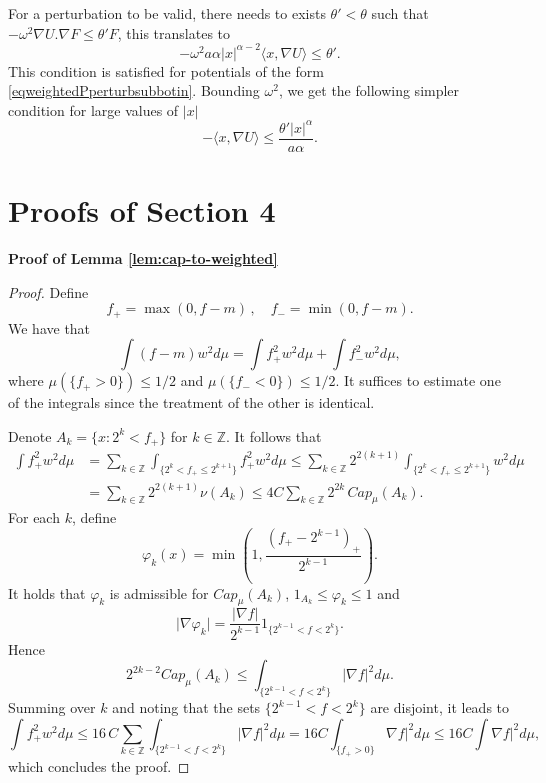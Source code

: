 \documentclass[11pt,reqno]{amsart}
\numberwithin{equation}{section}
\theoremstyle{definition}
\theoremstyle{remark}
\begin{document}
\begin{enumerate}
For a perturbation to be valid, there needs to exists $\theta'<\theta$ such that $-\omega^2\nabla U.\nabla F\le \theta' F$, this translates to 
    $$-\omega^2a\alpha\vert x\vert^{\alpha-2}\langle x, \nabla U\rangle\leq \theta'.$$
    This condition is satisfied for potentials of the form \eqref{eqweightedPperturbsubbotin}. Bounding $\omega^2$, we get the following simpler condition  for large values of $\vert x\vert$
    \begin{equation*}
        -\langle x, \nabla U\rangle\leq \frac{\theta'\vert x\vert^\alpha}{a\alpha}.
    \end{equation*}
\end{enumerate}

\section{Proofs of Section 4}\label{appendix_section_4}

\noindent \textbf{Proof of Lemma \ref{lem:cap-to-weighted}}
\begin{proof}
Define 
$$
f_+ = \max(0, f-m)\,,\quad f_- = \min(0, f-m).
$$
We have that 
$$
\int (f-m)w^2d\mu = \int f_+^2 w^2d\mu + \int f_-^2 w^2d\mu,
$$
where $\mu(\{f_+>0\}) \leq 1/2$ and $\mu(\{f_-<0\}) \leq 1/2$. It suffices to estimate one of the integrals since the treatment of the other is identical. 

Denote $A_k = \{x:2^k<f_+\}$ for $k\in\mathbb{Z}$. It follows that
\begin{align*}
\int f_+^2w^2 d\mu &= \sum_{k\in\mathbb{Z}} \int_{\{2^k<f_+\le 2^{k+1}\}} f_+^2w^2d\mu \leq  \sum_{k\in\mathbb{Z}} 2^{2(k+1)}\int_{\{2^k<f_+\le 2^{k+1}\}} w^2d\mu \\
&= \sum_{k\in\mathbb{Z}} 2^{2(k+1)}\nu(A_k)\le 4C \sum_{k\in\mathbb{Z}} 2^{2k} \,Cap_\mu(A_k).
\end{align*}
For each $k$, define
$$
\varphi_k(x) = \min\left(1, \frac{(f_+-2^{k-1})_+}{2^{k-1}}\right).
$$
It holds that $\varphi_k$ is admissible for $Cap_\mu(A_k)$,
$1_{A_k} \le \varphi_k\leq 1
$
and 
$$
\vert \nabla \varphi_k\vert = \frac{\vert \nabla f\vert}{2^{k-1}} 1_{\{2^{k-1}<f<2^k\}}.
$$
Hence 
$$
2^{2k-2}Cap_\mu(A_{k}) \le \int_{\{2^{k-1}<f<2^k\}}\vert \nabla f\vert^2 d\mu.
$$
Summing over $k$ and noting that the sets $\{2^{k-1}<f<2^k\}$ are disjoint, it leads to
$$
\int f_+^2 w^2 d\mu \le 16 \, C\sum_{k\in\mathbb{Z}} \int_{\{2^{k-1}<f<2^k\}}\vert \nabla f\vert^2 d\mu = 16C\int_{\{f_+>0\}} \nabla f\vert^2 d\mu\leq 16C\int \nabla f\vert^2 d\mu,
$$
which concludes the proof.
\end{proof}
\end{document}
